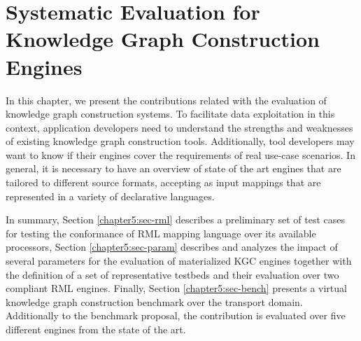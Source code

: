 \chapter{Systematic Evaluation for Knowledge Graph Construction Engines}
\label{chapter:evaluation}
In this chapter, we present the contributions related with the evaluation of knowledge graph construction systems. To facilitate data exploitation in this context, application developers need to understand the strengths and weaknesses of existing knowledge graph construction tools. Additionally, tool developers may want to know if their engines cover the requirements of real use-case scenarios. In general, it is necessary to have an overview of state of the art engines that are tailored to different source formats, accepting as input mappings that are represented in a variety of declarative languages. 

In summary, Section \ref{chapter5:sec-rml} describes a preliminary set of test cases for testing the conformance of RML mapping language over its available processors, Section \ref{chapter5:sec-param} describes and analyzes the impact of several parameters for the evaluation of materialized KGC engines together with the definition of a set of representative testbeds and their evaluation over two compliant RML engines. Finally, Section \ref{chapter5:sec-bench} presents a virtual knowledge graph construction benchmark over the transport domain. Additionally to the benchmark proposal, the contribution is evaluated over five different engines from the state of the art.







